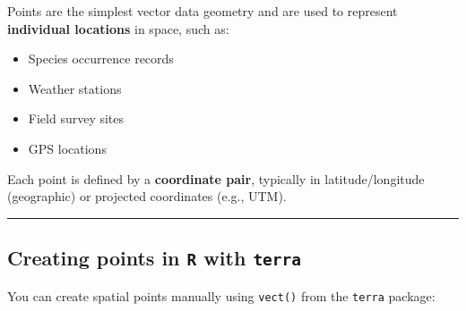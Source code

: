\documentclass[
]{book}
\providecommand{\tightlist}{%
  \setlength{\itemsep}{0pt}\setlength{\parskip}{0pt}}
\begin{document}
Points are the simplest vector data geometry and are used to represent
\textbf{individual locations} in space, such as:

\begin{itemize}
\tightlist
\item
  Species occurrence records\\
\item
  Weather stations\\
\item
  Field survey sites\\
\item
  GPS locations
\end{itemize}

Each point is defined by a \textbf{coordinate pair}, typically in
latitude/longitude (geographic) or projected coordinates (e.g., UTM).

\begin{center}\rule{0.5\linewidth}{0.5pt}\end{center}

\subsection{\texorpdfstring{Creating points in \texttt{R} with
\texttt{terra}}{Creating points in R with terra}}\label{creating-points-in-r-with-terra}

You can create spatial points manually using \texttt{vect()} from the
\texttt{terra} package:
\end{document}
